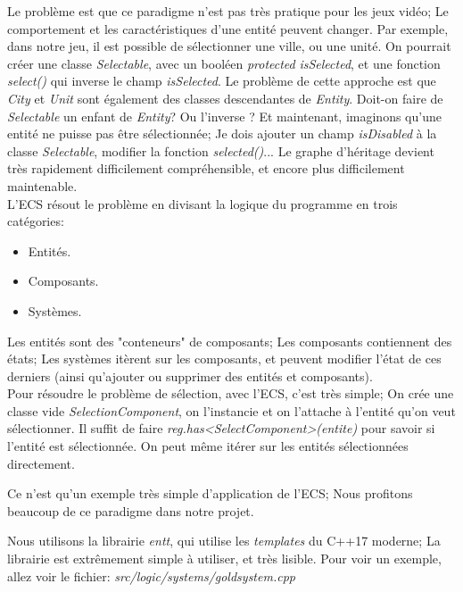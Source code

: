\documentclass[french]{article}
\begin{document}
Le problème est que ce paradigme n'est pas très pratique pour les jeux vidéo; Le comportement et les caractéristiques d'une entité peuvent changer. Par exemple, dans notre jeu, il est possible de sélectionner une ville, ou une unité. On pourrait créer une classe \textit{Selectable}, avec un booléen \textit{protected} \textit{isSelected}, et une fonction \textit{select()} qui inverse le champ \textit{isSelected}. Le problème de cette approche est que \textit{City} et \textit{Unit} sont également des classes descendantes de \textit{Entity}. Doit-on faire de \textit{Selectable} un enfant de \textit{Entity}? Ou l'inverse ? Et maintenant, imaginons qu'une entité ne puisse pas être sélectionnée; Je dois ajouter un champ \textit{isDisabled} à la classe \textit{Selectable}, modifier la fonction \textit{selected()}... Le graphe d'héritage devient très rapidement difficilement compréhensible, et encore plus difficilement maintenable.  \\


L'ECS résout le problème en divisant la logique du programme en trois catégories:

\begin{itemize}
	\item Entités.
	\item Composants.
	\item Systèmes.
\end{itemize}

Les entités sont des "conteneurs" de composants; Les composants contiennent des états; Les systèmes itèrent sur les composants, et peuvent modifier l'état de ces derniers (ainsi qu'ajouter ou supprimer des entités et composants).\\

Pour résoudre le problème de sélection, avec l'ECS, c'est très simple; On crée une classe vide \textit{SelectionComponent}, on l'instancie et on l'attache à l'entité qu'on veut sélectionner. Il suffit de faire \textit{reg.has<SelectComponent>(entite)} pour savoir si l'entité est sélectionnée. On peut même itérer sur les entités sélectionnées directement.

Ce n'est qu'un exemple très simple d'application de l'ECS; Nous profitons beaucoup de ce paradigme dans notre projet.

Nous utilisons la librairie \textit{entt}, qui utilise les \textit{templates} du C++17 moderne; La librairie est extrêmement simple à utiliser, et très lisible. Pour voir un exemple, allez voir le fichier: \textit{src/logic/systems/gold\textunderscore system.cpp}\\
\end{document}
